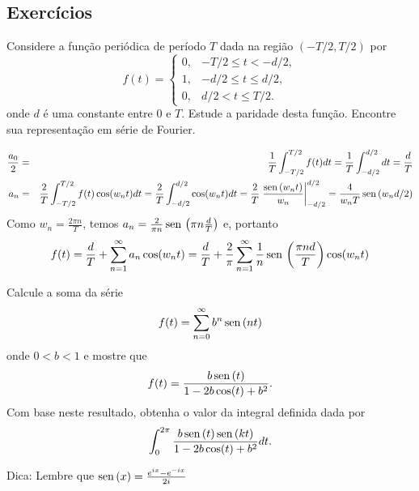 \subsection*{Exercícios}

 \begin{exer}
Considere a função periódica de período $T$ dada na região $(-T/2,T/2)$ por
\begin{equation}f(t)=\left\{
\begin{array}{lc}
0,&-T/2\leq t < -d/2,\\
1,&-d/2\leq t \leq d/2,\\
0,&d/2 < t \leq T/2.
\end{array}
\right.\end{equation}
onde $d$ é uma constante entre $0$ e $T$.
Estude a paridade desta função. Encontre sua representação em série de Fourier. 
\end{exer}
\begin{resp}
\begin{eqnarray*} \frac{a_0}{2}&=&\frac{1}{T}\int_{-T/2}^{T/2}f(t)dt=\frac{1}{T}\int_{-d/2}^{d/2}dt=\frac{d}{T}\\
a_n&=&\frac{2}{T}\int_{-T/2}^{T/2}f(t)\cos(w_nt)dt=\frac{2}{T}\int_{-d/2}^{d/2}\cos(w_nt)dt=\frac{2}{T}\left.\frac{\operatorname{sen}\,(w_nt)}{w_n}\right|_{-d/2}^{d/2}=\frac{4}{w_nT}\operatorname{sen}\,(w_nd/2)
\end{eqnarray*}
Como
$w_n=\frac{2\pi n}{T}$, temos $ a_n=\frac{2}{\pi n}\operatorname{sen}\,\left(\pi n\frac{d}{T}\right)$ e, portanto
\begin{equation}f(t)=\frac{d}{T}+\sum_{n=1}^\infty a_n \cos(w_n t)=\frac{d}{T}+\frac{2}{\pi}\sum_{n=1}^\infty \frac{1}{n}\operatorname{sen}\,\left(\frac{\pi n d}{T}\right) \cos(w_n t)\end{equation}
\end{resp}
\begin{exer}Calcule a soma da série
\begin{equation}f(t)=\sum_{n=0}^\infty b^{n}\operatorname{sen}\,(nt)\end{equation}
onde $0<b<1$ e mostre que
\begin{equation}f(t)=\frac{b\operatorname{sen}\,(t)}{1-2b\cos(t)+b^2}.\end{equation}
Com base neste resultado, obtenha o valor da integral definida dada por
\begin{equation}\int_0^{2\pi}\frac{b\operatorname{sen}\,(t)\operatorname{sen}\,(kt)}{1-2b\cos(t)+b^2}dt.\end{equation}
\end{exer}
\begin{resp}
 Dica: Lembre que $\operatorname{sen}\,(x)=\frac{e^{ix}-e^{-ix}}{2i}$
\end{resp}
